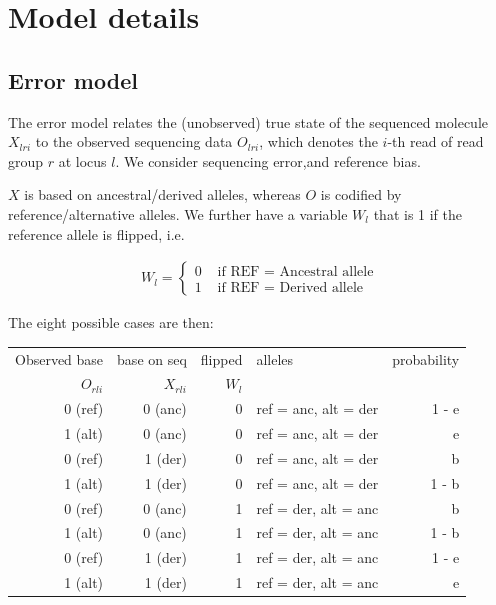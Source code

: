\documentclass[10pt,a4paper]{article}
\begin{document}
\section*{Model details}
\subsection*{Error model}
The error model relates the (unobserved) true state of the sequenced molecule $X_{lri}$ to the observed sequencing data $O_{lri}$, which denotes the $i$-th read of read group $r$ at locus $l$. We consider sequencing error,and reference bias.

$X$ is based on ancestral/derived alleles, whereas $O$ is codified by reference/alternative alleles. We further have a variable $W_l$ that is 1 if the reference allele is flipped, i.e.

\begin{align*}
W_l = \begin{cases}
0 & \text{ if REF = Ancestral allele}\\
1&  \text{ if REF = Derived allele}
\end{cases}
\end{align*}

The eight possible cases are then:

\begin{table}[!ht]
\begin{center}

\begin{tabular}{r r r l | r}
Observed base & base on seq & flipped & alleles & probability\\
$O_{rli}$ & $X_{rli}$ & $W_l$ &\\
\hline
0 (ref) & 0 (anc)& 0 &ref = anc, alt = der & 1 - e\\
1 (alt) & 0 (anc)& 0 &ref = anc, alt = der& e\\
0 (ref) & 1 (der)& 0 &ref = anc, alt = der& b\\
1 (alt) & 1 (der)& 0 &ref = anc, alt = der& 1 - b\\
0 (ref) & 0 (anc)& 1 &ref = der, alt = anc& b \\
1 (alt) & 0 (anc)& 1 &ref = der, alt = anc& 1 - b\\
0 (ref) & 1 (der)& 1 &ref = der, alt = anc& 1 - e\\
1 (alt) & 1 (der)& 1 &ref = der, alt = anc& e \\
\end{tabular}
\end{center}
\end{table}
\end{document}
